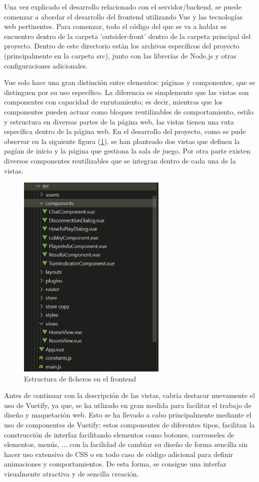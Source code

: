 Una vez explicado el desarrollo relacionado con el servidor/backend, se puede comenzar a abordar el desarrollo del frontend utilizando Vue
y las tecnologías web pertinentes. Para comenzar, todo el código del que se va a hablar se encuentro dentro de la carpeta 'outsider-front' dentro de la carpeta
principal del proyecto. Dentro de este directorio están los archivos específicos del proyecto (principalmente en la carpeta src), junto con las librerías de Node.js y otras 
configuraciones adicionales.

Vue solo hace una gran distinción entre elementos: páginas y componentes, que se distinguen por su uso específico. La diferencia es simplemente que 
las vistas son componentes con capacidad de enrutamiento; es decir, mientras que los componentes pueden actuar como bloques reutilizables de comportamiento, estilo 
y estructura en diversas partes de la página web, las vistas tienen una ruta específica dentro de la página web. En el desarrollo del proyecto, como se pude observar 
en la siguiente figura (\ref{fig:res_estructFronted}), se han planteado dos vistas que definen la pagían de inicio y la página que gestiona la sala de juego. Por otra parte
existen diversos componentes reutilizables que se integran dentro de cada una de la vistas.

\begin{figure}[h]
	\centering
	\includegraphics[height=10cm,clip=true]{res_estructFronted.png}
	\caption{Estructura de ficheros en el frontend}
	\label{fig:res_estructFronted}
\end{figure}

Antes de continuar con la descripción de las vistas, cabría destacar nuevamente el uso de Vuetify, ya que, se ha utlizado en gran medida para facilitar 
el trabajo de diseño y maquetación web. Esto se ha llevado a cabo principalmente mediante el uso de componentes de Vuetify; estos componentes de diferentes tipos, facilitan la
construcción de interfaz facilitando elementos como botones, carrouseles de elementos, menús, ... con la facilidad de cambiar su diseño de forma sencilla sin hacer uso
extensivo de CSS o en todo caso de código adicional para definir animaciones y comportamientos. De esta forma, se consigue una interfaz visualmente atractiva y de sencilla
creación.

